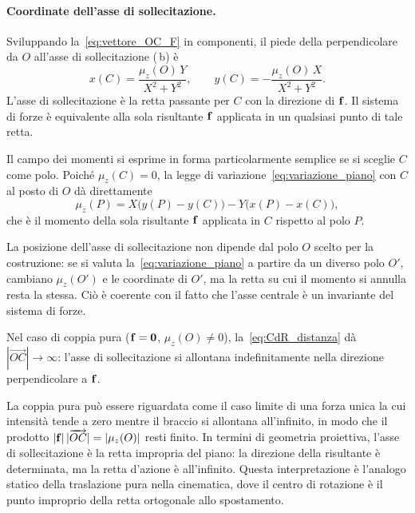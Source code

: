 \paragraph{Coordinate dell'asse di sollecitazione.}
Sviluppando la~\eqref{eq:vettore_OC_F} in componenti, il
piede della perpendicolare da $O$ all'asse di sollecitazione  (\,b) è
\begin{equation}\label{eq:CdR_coord}
	x(C) =  \frac{\mu_z(O)\,Y}{X^2+Y^2},
	\qquad
	y(C) =  - \frac{\mu_z(O)\,X}{X^2+Y^2}.
\end{equation}
L'asse di sollecitazione è la retta passante per $C$ con la
direzione di $\mathbf{f}$. Il sistema di forze è equivalente alla
sola risultante $\mathbf{f}$ applicata in un qualsiasi punto di
tale retta.

Il campo dei momenti si esprime in forma particolarmente
semplice se si sceglie $C$ come polo. Poiché
$\mu_z(C) = 0$, la legge di
variazione~\eqref{eq:variazione_piano} con $C$ al posto di
$O$ dà direttamente
\begin{equation}\label{eq:momento_da_CdR}
	\mu_z(P) = X\bigl(y(P) - y(C)\bigr)
	- Y\bigl(x(P) - x(C)\bigr),
\end{equation}
che è il momento della sola risultante $\mathbf{f}$ applicata in $C$
rispetto al polo $P$.

\begin{oss}
	La posizione dell'asse di sollecitazione non dipende dal
	polo $O$ scelto per la costruzione: se si valuta
	la~\eqref{eq:variazione_piano} a partire da un diverso
	polo $O'$, cambiano $\mu_z(O')$ e le coordinate di $O'$,
	ma la retta su cui il momento si annulla resta la stessa.
	Ciò è coerente con il fatto che l'asse centrale è un
	invariante del sistema di forze.
\end{oss}

Nel caso di coppia pura ($\mathbf{f} = \mathbf{0}$,
$\mu_z(O) \neq 0$), la~\eqref{eq:CdR_distanza} dà
$|\overrightarrow{OC}| \to \infty$: l'asse di sollecitazione
si allontana indefinitamente nella direzione perpendicolare a
$\mathbf{f}$.

\begin{oss}
	La coppia pura può essere riguardata come il caso limite
	di una forza unica la cui intensità tende a zero mentre
	il braccio si allontana all'infinito, in modo che il
	prodotto $|\mathbf{f}|\,|\overrightarrow{OC}| = |\mu_z(O)|$
	resti finito. In termini di geometria proiettiva, l'asse
	di sollecitazione è la retta impropria del piano: la
	direzione della risultante è determinata, ma la retta
	d'azione è all'infinito. Questa interpretazione è
	l'analogo statico della traslazione pura nella cinematica,
	dove il centro di rotazione è il punto improprio della
	retta ortogonale allo spostamento.
\end{oss}

